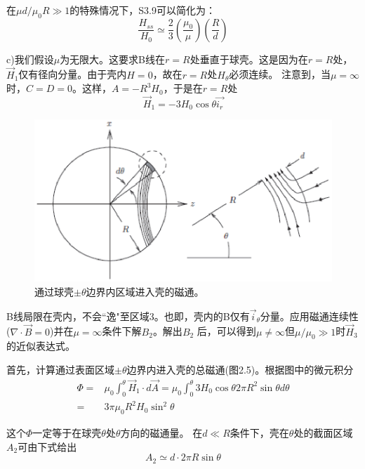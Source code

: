 在$\mu d/\mu_0 R \gg 1$的特殊情况下，S3.9可以简化为：
\begin{equation*}
\frac{H_{ss}}{H_0}\simeq \frac{2}{3}(\frac{\mu_0}{\mu})(\frac{R}{d})  \tag{2.47}
\end{equation*}

c)我们假设$\mu$为无限大。这要求B线在$r=R$处垂直于球壳。这是因为在$r=R$处，$\vec{H}_1$仅有径向分量。由于壳内$H=0$，故在$r=R$处$H_\theta$必须连续。
注意到，当$\mu=\infty$时，$C=D=0$。这样，$A=-R^3 H_0$，于是在$r=R$处
\begin{equation*}
\vec{H}_1=-3 H_0 \cos\theta \vec{i_r} \tag{S3.10}
\end{equation*}

\begin{figure}[htbp]
	\centering
	\includegraphics[scale=0.7]{chpt2/figs/fig2.5.eps}
	\caption{通过球壳$\pm \theta$边界内区域进入壳的磁通。}
\end{figure}

B线局限在壳内，不会``逸"至区域3。也即，壳内的B仅有$\vec{i}_\theta$分量。应用磁通连续性($\nabla \cdot \vec{B}=0$)并在$\mu=\infty$条件下解$B_2$。解出$B_2$
后，可以得到$\mu \neq \infty$但$\mu/\mu_0 \gg 1$时$\vec{H}_3$的近似表达式。

首先，计算通过表面区域$\pm \theta$边界内进入壳的总磁通(图2.5)。根据图中的微元积分
\begin{align}
\Phi=&\mu_0\int_{0}^{\theta} \vec{H}_1 \cdot d\vec{A}=\mu_0\int_{0}^{\theta} 3H_0\cos\theta 2\pi R^2 \sin\theta d\theta\nonumber\\
=&3\pi\mu_0 R^2 H_0 \sin^2 \theta\nonumber \tag{S3.11}
\end{align}


这个$\Phi$一定等于在球壳$\theta$处$\theta$方向的磁通量。
在$d\ll R$条件下，壳在$\theta$处的截面区域$A_2$可由下式给出
\begin{equation*}
A_2\simeq d\cdot 2\pi R\sin\theta \tag{S3.12}
\end{equation*}

